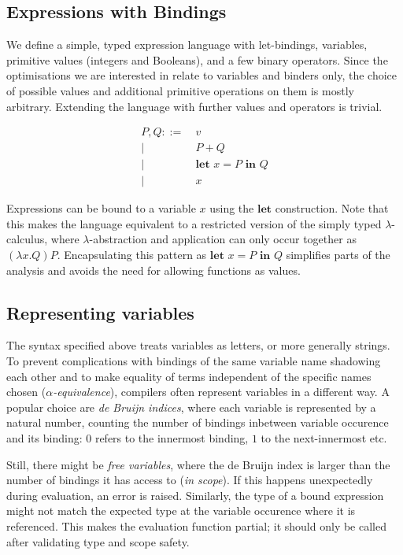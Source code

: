 \documentclass[11pt,a4paper]{article}
\begin{document}
\subsection{Expressions with Bindings}

We define a simple, typed expression language with let-bindings,
variables, primitive values (integers and Booleans), and a few binary operators.
Since the optimisations we are interested in relate to variables and binders only,
the choice of possible values and additional primitive operations on them is mostly arbitrary.
Extending the language with further values and operators is trivial.

\begin{align*}
  P, Q ::=&\ v
  \\ \big|&\ P + Q
  \\ \big|&\ \textbf{let } x = P \textbf{ in } Q
  \\ \big|&\ x
\end{align*}

Expressions can be bound to a variable $x$ using the $\textbf{let}$ construction.
Note that this makes the language equivalent to a restricted version of the simply typed $\lambda$-calculus,
where $\lambda$-abstraction and application can only occur together as $(\lambda x. Q) P$.
Encapsulating this pattern as $\textbf{let } x = P \textbf{ in } Q$
simplifies parts of the analysis and
avoids the need for allowing functions as values.


\subsection{Representing variables}

The syntax specified above treats variables as letters, or more generally strings.
To prevent complications with bindings of the same variable name shadowing each other
and to make equality of terms independent of the specific names chosen
(\emph{$\alpha$-equivalence}),
compilers often represent variables in a different way.
A popular choice are \emph{de Bruijn indices},
where each variable is represented by a natural number,
counting the number of bindings inbetween variable occurence and its binding:
$0$ refers to the innermost binding, $1$ to the next-innermost etc.

Still, there might be \emph{free variables},
where the de Bruijn index is larger than the number of bindings it has access to
(\emph{in scope}).
If this happens unexpectedly during evaluation, an error is raised.
Similarly, the type of a bound expression might not match the expected type at the variable occurence
where it is referenced.
This makes the evaluation function partial;
it should only be called after validating type and scope safety.
\end{document}

